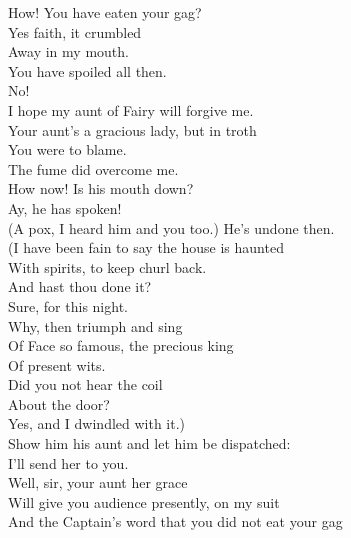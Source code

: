 \documentclass[a4paper,oneside,12pt]{memoir}
\begin{document}
\begin{drama*}
\subtlespeaks How! You have eaten your gag?\\
\dapperspeaks {} Yes faith, it crumbled\\
Away in my mouth.\\
\subtlespeaks {} You have spoiled all then.\\
\dapperspeaks {} No!\\
I hope my aunt of Fairy will forgive me.\\
\subtlespeaks Your aunt's a gracious lady, but in troth\\
You were to blame.\\
\dapperspeaks {} The fume did overcome me.\\
\facespeaks How now! Is his mouth down?\\
\subtlespeaks {} Ay, he has spoken!\\
\facespeaks (A pox, I heard him and you too.) He's undone then.\\
(I have been fain to say the house is haunted\\
With spirits, to keep churl back.\\
\subtlespeaks {} And hast thou done it?\\
\facespeaks Sure, for this night.\\
\subtlespeaks {} Why, then triumph and sing\\
Of Face so famous, the precious king\\
Of present wits.\\
\facespeaks {} Did you not hear the coil\\
About the door?\\
\subtlespeaks {} Yes, and I dwindled with it.)\\
\facespeaks Show him his aunt and let him be dispatched:\\
I'll send her to you.\\
\subtlespeaks {} Well, sir, your aunt her grace\\
Will give you audience presently, on my suit\\
And the Captain's word that you did not eat your gag\\

\end{drama*}
\end{document}
